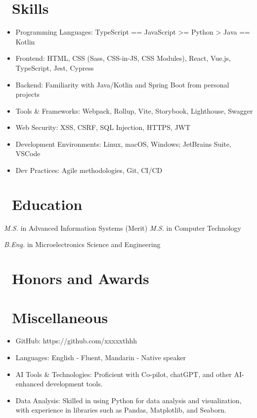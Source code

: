 \documentclass{resume}
\begin{document}
\section{\faCogs\ Skills}
\begin{itemize}[parsep=0.5ex]
  \item Programming Languages: TypeScript == JavaScript >= Python > Java == Kotlin
  \item Frontend: HTML, CSS (Sass, CSS-in-JS, CSS Modules), React, Vue.js, TypeScript, Jest, Cypress
  \item Backend: Familiarity with Java/Kotlin and Spring Boot from personal projects
  \item Tools \& Frameworks: Webpack, Rollup, Vite, Storybook, Lighthouse, Swagger
  \item Web Security: XSS, CSRF, SQL Injection, HTTPS, JWT
  \item Development Environments: Linux, macOS, Windows; JetBrains Suite, VSCode
  \item Dev Practices: Agile methodologies, Git, CI/CD
\end{itemize}

\section{\faGraduationCap\ Education}
\textit{M.S.} in Advanced Information Systems (Merit)
\textit{M.S.} in Computer Technology

\textit{B.Eng.} in Microelectronics Science and Engineering

\section{\faHeartO\ Honors and Awards}

\section{\faInfo\ Miscellaneous}
\begin{itemize}[parsep=0.5ex]
  \item GitHub: https://github.com/xxxxxthhh
  \item Languages: English - Fluent, Mandarin - Native speaker
  \item AI Tools \& Technologies: Proficient with Co-pilot, chatGPT, and other AI-enhanced development tools.
  \item Data Analysis: Skilled in using Python for data analysis and visualization, with experience in libraries such as Pandas, Matplotlib, and Seaborn.
\end{itemize}

%
%
\end{document}
